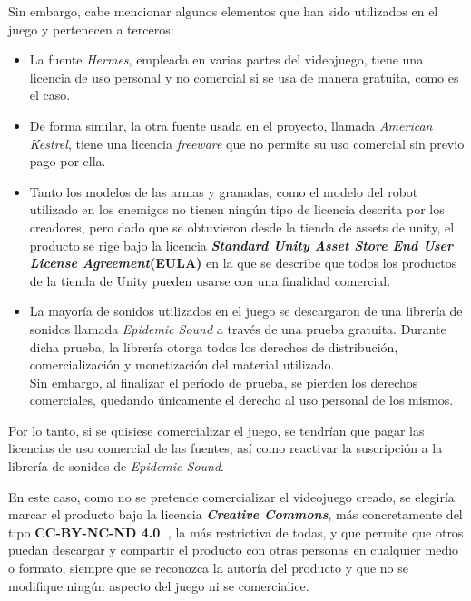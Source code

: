 Sin embargo, cabe mencionar algunos elementos que han sido utilizados en el juego y pertenecen a terceros:
\begin{itemize}
    \item La fuente \textit{Hermes}, empleada en varias partes del videojuego, tiene una licencia de uso personal y no comercial si se usa de manera gratuita, como es el caso.
    \item De forma similar, la otra fuente usada en el proyecto, llamada \textit{American Kestrel}, tiene una licencia \textit{freeware} que no permite su uso comercial sin previo pago por ella.
    \item Tanto los modelos de las armas y granadas, como el modelo del robot utilizado en los enemigos no tienen ningún tipo de licencia descrita por los creadores, pero dado que se obtuvieron desde la tienda de assets de unity, el producto se rige bajo la licencia \textbf{\textit{Standard Unity Asset Store End User License Agreement}(EULA)}  en la que se describe que todos los productos de la tienda de Unity pueden usarse con una finalidad comercial.
    \item La mayoría de sonidos utilizados en el juego se descargaron de una librería de sonidos llamada \textit{Epidemic Sound} a través de una prueba gratuita. Durante dicha prueba, la librería otorga todos los derechos de distribución, comercialización y monetización del material utilizado.\\ 
    Sin embargo, al finalizar el período de prueba, se pierden los derechos comerciales, quedando únicamente el derecho al uso personal de los mismos.
\end{itemize}
Por lo tanto, si se quisiese comercializar el juego, se tendrían que pagar las licencias de uso comercial de las fuentes, así como reactivar la suscripción a la librería de sonidos de \textit{Epidemic Sound}.

En este caso, como no se pretende comercializar el videojuego creado, se elegiría marcar el producto bajo la licencia \textbf{\textit{Creative Commons}}, más concretamente del tipo \textbf{CC-BY-NC-ND 4.0}. \cite{wiki:Licencia}, la más restrictiva de todas, y que permite que otros puedan descargar y compartir el producto con otras personas en cualquier medio o formato, siempre que se reconozca la autoría del producto y que no se modifique ningún aspecto del juego ni se comercialice.